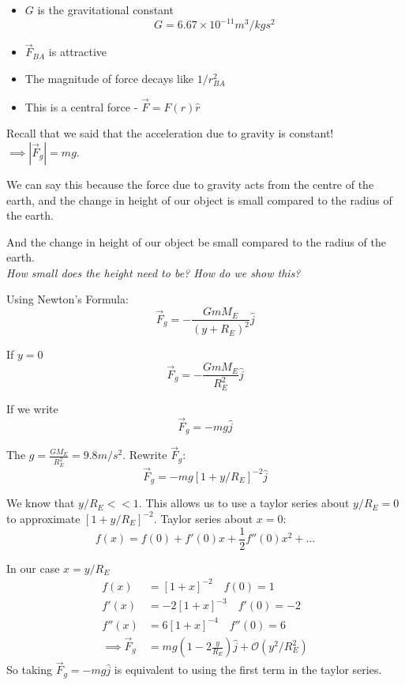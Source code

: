 \documentclass[10pt]{scrartcl}
\begin{document}
\begin{itemize}
\item $G$ is the gravitational constant 
\[G = 6.67 \times 10^{-11} m^3/kgs^2\]	
\item $\vec{F}_{BA}$ is attractive
\item The magnitude of force decays like $1/r^2_{BA}$ 
\item This is a central force - $\vec{F} = F(r)\hat{r}$
\end{itemize}

Recall that we said that the acceleration due to gravity is constant! $\implies |\vec{F}_g| = mg$.

We can say this because the force due to gravity acts from the centre of the earth, and the change in height of our object is small compared to the radius of the earth.

And the change in height of our object be small compared to the radius of the earth.\\

\emph{How small does the height need to be? How do we show this?} 

\begin{center}
\end{center}

Using Newton's Formula:
\[\vec{F}_g = -\frac{GmM_E}{(y+R_E)^2}\hat{j}\]

If $y =0$
\[\vec{F}_g = -\frac{GmM_E}{R_E^2}\hat{j}\]

If we write 
\[\vec{F}_g = -mg\hat{j}\]

The $g = \frac{GM_E}{R^2_E} = 9.8m/s^2$. Rewrite $\vec{F}_g$:
\[\vec{F}_g = -mg[1 + y/R_E]^{-2}\hat{j}\]

We know that $y/R_E << 1$. This allows us to use a taylor series about $y/R_E = 0$ to approximate $[1 + y/R_E]^{-2}$. Taylor series about $x = 0$:
\[f(x) = f(0) + f'(0)x + \textstyle{\frac{1}{2}f''(0)x^2 + \dots }\]

In our case $x = y/R_E$
\[
\begin{aligned}
f(x) &= [1+x]^{-2} \quad f(0) = 1\\
f'(x) &= -2[1+x]^{-3} \quad f'(0) = -2\\
f''(x) &= 6[1+x]^{-4} \quad f''(0) = 6\\
\implies \vec{F}_g &= mg(1-2\frac{y}{R_E})\hat{j} + \mathcal{O}(y^2/R^2_E)
\end{aligned}
\]
So taking $\vec{F}_g = -mg\hat{j}$ is equivalent to using the first term in the taylor series.\\
\end{document}
